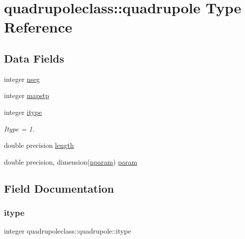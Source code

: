 \hypertarget{structquadrupoleclass_1_1quadrupole}{}\section{quadrupoleclass\+::quadrupole Type Reference}
\label{structquadrupoleclass_1_1quadrupole}
\subsection*{Data Fields}
\begin{DoxyCompactItemize}
\item 
integer \mbox{\hyperlink{structquadrupoleclass_1_1quadrupole_afece7d333f73554720932318f413f11b}{nseg}}
\item 
integer \mbox{\hyperlink{structquadrupoleclass_1_1quadrupole_a283a967adb1fb9dd7c742b5ce97ef3a0}{mapstp}}
\item 
integer \mbox{\hyperlink{structquadrupoleclass_1_1quadrupole_addaf50b0cff1aec9fc452925c7819bdb}{itype}}
\begin{DoxyCompactList}\small\item\em Itype = 1. \end{DoxyCompactList}\item 
double precision \mbox{\hyperlink{structquadrupoleclass_1_1quadrupole_ac84e0debf991be5cd71ee964781dd7af}{length}}
\item 
double precision, dimension(\mbox{\hyperlink{namespacequadrupoleclass_a8eba81bd9796e431c21d0f46260b0c6c}{nparam}}) \mbox{\hyperlink{structquadrupoleclass_1_1quadrupole_ab9bcd11b6a6e1b6d7242eb243029393f}{param}}
\end{DoxyCompactItemize}


\subsection{Field Documentation}
\mbox{\label{structquadrupoleclass_1_1quadrupole_addaf50b0cff1aec9fc452925c7819bdb}} 
\subsubsection{\texorpdfstring{itype}{itype}}
{\footnotesize\ttfamily integer quadrupoleclass\+::quadrupole\+::itype}



